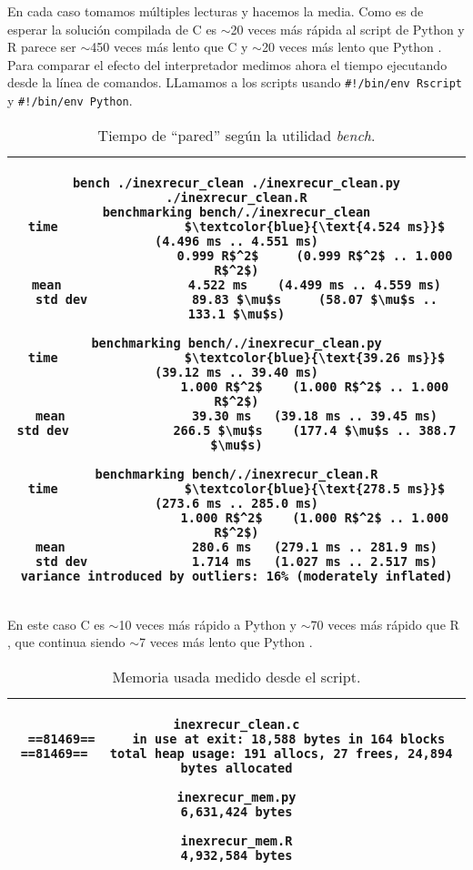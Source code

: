 \documentclass{article}
\newcommand{\tempcaption}{}
\newenvironment{codesnip}[1]{
\begin{table}[h!]
\gdef\tempcaption{#1}
\centering
\begin{tabular}{|c|}
\hline}
{\\\hline
\end{tabular}
\caption{\tempcaption}
\end{table}}
\newcommand{\C}{C }
\newcommand{\R}{R }
\newcommand{\python}{Python }
\begin{document}
\vspace{-0.75cm}
En cada caso tomamos múltiples lecturas y hacemos la media. Como es de
esperar la solución compilada de \C{} es $\sim$20 veces más rápida  al
script de \python y \R parece ser $\sim$450 veces más lento que \C{} y
$\sim$20 veces más lento que \python.  Para  comparar  el  efecto  del
interpretador medimos ahora el tiempo ejecutando  desde  la  línea  de
comandos. LLamamos a los scripts usando \texttt{\#!/bin/env Rscript} y
\texttt{\#!/bin/env Python}.
\vspace{0.3cm}
\begin{codesnip}{Tiempo de ``pared'' según la utilidad \textit{bench}.}
\begin{lstlisting}
bench ./inexrecur_clean ./inexrecur_clean.py ./inexrecur_clean.R
benchmarking bench/./inexrecur_clean
time                 $\textcolor{blue}{\text{4.524 ms}}$           (4.496 ms .. 4.551 ms)
                     0.999 R$^2$     (0.999 R$^2$ .. 1.000 R$^2$)
mean                 4.522 ms    (4.499 ms .. 4.559 ms)
std dev              89.83 $\mu$s     (58.07 $\mu$s .. 133.1 $\mu$s)

benchmarking bench/./inexrecur_clean.py
time                 $\textcolor{blue}{\text{39.26 ms}}$           (39.12 ms .. 39.40 ms)
                     1.000 R$^2$    (1.000 R$^2$ .. 1.000 R$^2$)
mean                 39.30 ms   (39.18 ms .. 39.45 ms)
std dev              266.5 $\mu$s    (177.4 $\mu$s .. 388.7 $\mu$s)

benchmarking bench/./inexrecur_clean.R
time                 $\textcolor{blue}{\text{278.5 ms}}$           (273.6 ms .. 285.0 ms)
                     1.000 R$^2$    (1.000 R$^2$ .. 1.000 R$^2$)
mean                 280.6 ms   (279.1 ms .. 281.9 ms)
std dev              1.714 ms   (1.027 ms .. 2.517 ms)
variance introduced by outliers: 16% (moderately inflated)
\end{lstlisting}
\end{codesnip}

\vspace{-0.7cm}
En este caso \C{} es $\sim$10 veces más rápido a \python y $\sim$70
veces más rápido que \R, que continua siendo $\sim$7 veces más lento
que \python.

\clearpage
\begin{codesnip}{Memoria usada medido desde el script.}
\begin{lstlisting}
inexrecur_clean.c
==81469==     in use at exit: 18,588 bytes in 164 blocks
==81469==   total heap usage: 191 allocs, 27 frees, 24,894 bytes allocated

inexrecur_mem.py
6,631,424 bytes

inexrecur_mem.R
4,932,584 bytes
\end{lstlisting}
\end{codesnip}
\end{document}
